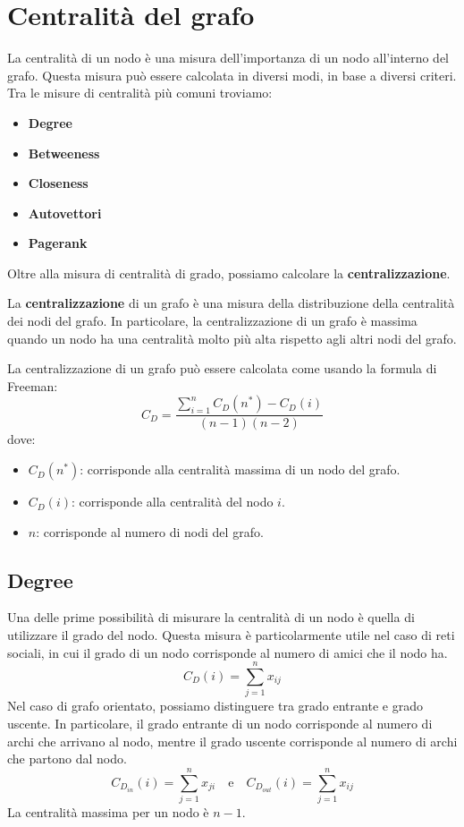 \section{Centralità del grafo}
La centralità di un nodo è una misura dell'importanza di un nodo all'interno
del grafo. Questa misura può essere calcolata in diversi modi, in base a
diversi criteri. Tra le misure di centralità più comuni troviamo:
\begin{itemize}
    \item \textbf{Degree}
    \item \textbf{Betweeness}
    \item \textbf{Closeness}
    \item \textbf{Autovettori}
    \item \textbf{Pagerank}
\end{itemize}
Oltre alla misura di centralità di grado, possiamo calcolare la \textbf{centralizzazione}.
\begin{definizione}
    La \textbf{centralizzazione} di un grafo è una misura della distribuzione
    della centralità dei nodi del grafo. In particolare, la centralizzazione
    di un grafo è massima quando un nodo ha una centralità molto più alta
    rispetto agli altri nodi del grafo.
\end{definizione}

La centralizzazione di un grafo può essere calcolata come usando la formula di Freeman:
\begin{equation}
    C_D = \frac{\sum_{i=1}^{n} C_D(n^\ast) - C_D(i)}{(n - 1)(n - 2)}
\end{equation}
dove:
\begin{itemize}
    \item $C_D(n^\ast)$: corrisponde alla centralità massima di un nodo del grafo.
    \item $C_D(i)$: corrisponde alla centralità del nodo $i$.
    \item $n$: corrisponde al numero di nodi del grafo.
\end{itemize}
\subsection{Degree}
Una delle prime possibilità di misurare la centralità di un nodo è quella di
utilizzare il grado del nodo. Questa misura è particolarmente utile nel caso di
reti sociali, in cui il grado di un nodo corrisponde al numero di amici che
il nodo ha.
\begin{equation}
    C_D(i) = \sum_{j=1}^{n} x_{ij}
\end{equation}
Nel caso di grafo orientato, possiamo distinguere tra grado entrante e grado
uscente. In particolare, il grado entrante di un nodo corrisponde al numero di
archi che arrivano al nodo, mentre il grado uscente corrisponde al numero di
archi che partono dal nodo.
\begin{equation}
    C_{D_{in}}(i) = \sum_{j=1}^{n} x_{ji} \quad \text{e} \quad
    C_{D_{out}}(i) = \sum_{j=1}^{n} x_{ij}
\end{equation}
La centralità massima per un nodo è $n - 1$.

